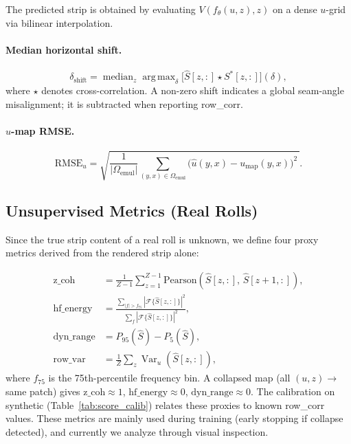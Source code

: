 \documentclass[11pt,a4paper]{article}
\DeclareMathOperator*{\argmax}{arg\,max}
\begin{document}
The predicted strip is obtained by evaluating $V(f_\theta(u, z), z)$ on a dense $u$-grid via bilinear interpolation.

\paragraph{Median horizontal shift.}
\begin{equation}
    \delta_{\text{shift}} = \operatorname{median}_z \argmax_\delta \bigl[\hat{S}[z,:] \star S^*[z,:]\bigr](\delta),
\end{equation}
where $\star$ denotes cross-correlation. A non-zero shift indicates a global seam-angle misalignment; it is subtracted when reporting row\_corr.

\paragraph{$u$-map RMSE.}
\begin{equation}
    \text{RMSE}_u = \sqrt{\frac{1}{|\Omega_{\text{emul}}|}\sum_{(y,x) \in \Omega_{\text{emul}}} \bigl(\hat{u}(y,x) - u_{\text{map}}(y,x)\bigr)^2\,}.
\end{equation}

\subsection{Unsupervised Metrics (Real Rolls)}

Since the true strip content of a real roll is unknown, we define four proxy metrics derived from the rendered strip alone:

\begin{align}
    \text{z\_coh} &= \frac{1}{Z-1}\sum_{z=1}^{Z-1} \text{Pearson}(\hat{S}[z,:],\, \hat{S}[z+1,:]),\label{eq:zcoh}\\
    \text{hf\_energy} &= \frac{\sum_{|f| > f_{75}} |\mathcal{F}\{\hat{S}[z,:]\}|^2}{\sum_f |\mathcal{F}\{\hat{S}[z,:]\}|^2},\label{eq:hf}\\
    \text{dyn\_range} &= P_{95}(\hat{S}) - P_5(\hat{S}),\\
    \text{row\_var} &= \frac{1}{Z}\sum_z \operatorname{Var}_u(\hat{S}[z,:]),
\end{align}
where $f_{75}$ is the 75th-percentile frequency bin. A collapsed map (all $(u,z) \to$ same patch) gives $\text{z\_coh} \approx 1$, $\text{hf\_energy} \approx 0$, $\text{dyn\_range} \approx 0$. The calibration on synthetic (Table~\ref{tab:score_calib}) relates these proxies to known row\_corr values. These metrics are mainly used during training (early stopping if collapse detected), and currently we analyze through visual inspection.
\end{document}
